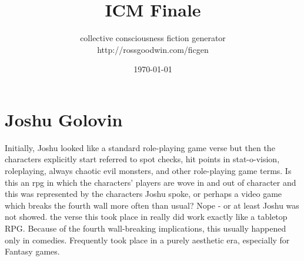 \documentclass[12pt]{book}
\title{ICM Finale}
\author{collective consciousness fiction generator\\http://rossgoodwin.com/ficgen}
\date{\today}
\begin{document}
\maketitle



\chapter{Joshu Golovin}

Initially, Joshu looked like a standard role-playing game verse  but then the characters explicitly start referred to spot checks, hit points in stat-o-vision, roleplaying, always chaotic evil monsters, and other role-playing game terms. Is this an rpg in which the characters' players are wove in and out of character and this was represented by the characters Joshu spoke, or perhaps a video game which breaks the fourth wall more often than usual? Nope - or at least Joshu was not showed. the verse this took place in really did work exactly like a tabletop RPG. Because of the fourth wall-breaking implications, this usually happened only in comedies. Frequently took place in a purely aesthetic era, especially for Fantasy games.
\end{document}
